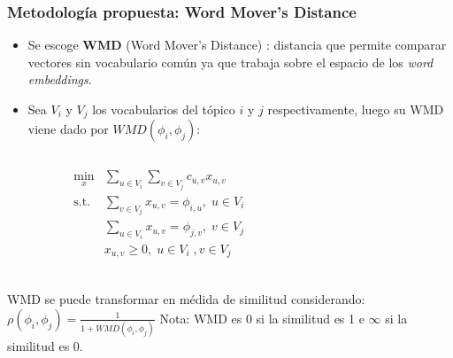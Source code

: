 \documentclass[
	spanish, %
	aspectratio=43, %
	hyperref={pdfencoding=auto,psdextra},
	xcolor={dvipsnames,table,usenames},
]{beamer}
\begin{document}
\begin{frame}[t]
\frametitle{Metodología propuesta: Word Mover's Distance}
\begin{itemize}
  \item Se escoge \textbf{WMD} (Word Mover's Distance) \cite{kusner2015word}: distancia que permite comparar vectores sin vocabulario común ya que trabaja sobre el espacio de los \textit{word embeddings}. 
  \item Sea  $V_{i}$ y $V_{j}$ los vocabularios del tópico $i$ y $j$ respectivamente, luego su WMD viene dado por $WMD(\phi_{i}, \phi_{j})$:
\end{itemize}

\vspace*{-0.3in}
\begin{columns}
\begin{column}{0.4\textwidth}

\begin{align}
\underset{x}{\text{min}}&\sum_{u \in V_{i}}\sum_{v \in V_{j}} c_{u,v}x_{u,v} \\ 
\textrm{s.t.} &\sum_{v \in V_{j}}x_{u,v}= \phi_{i,u}, \; u \in V_{i}\\ 
& \sum_{u \in V_{i}}x_{u,v}= \phi_{j,v}, \; v\in V_{j}\\
& x_{u,v} \geq 0,\; u \in V_{i} \;, v \in V_{j}\\ \nonumber
\end{align}

\end{column}

\begin{column}{0.6\textwidth}
\end{column}

\end{columns}
WMD se puede transformar en médida de similitud considerando: $\rho(\phi_{i}, \phi_{j}) = \frac{1}{1+WMD(\phi_{i}, \phi_{j})}$ Nota: WMD es 0 si la similitud es 1 e $\infty$ si la similitud es 0.

\end{frame}
\end{document}
